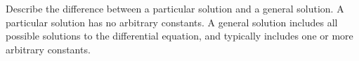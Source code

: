 {
Describe the difference between a particular solution and a general solution.
}
{
A particular solution has no arbitrary constants.  A general solution includes all possible solutions to the differential equation, and typically includes one or more arbitrary constants.
}
